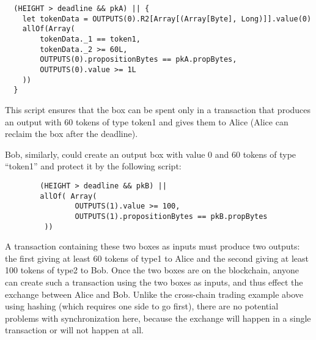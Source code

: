 \documentclass[11pt]{article}
\newcommand{\authnote}[2]{\marginpar{\parbox{\marginparwidth}{\tiny %
  \textsf{#1 {\textcolor{blue}{notes: #2}}}}}%
  \textcolor{blue}{\textbf{\dag}}}
\newcommand{\authnote}[2]{
  \textsf{#1 \textcolor{blue}{: #2}}}
\newcommand{\authnote}[2]{}
\newcommand{\lnote}[1]{{\authnote{\textcolor{orange}{Leo notes}}{#1}}}
\newcommand{\mnote}[1]{{\authnote{\textcolor{red}{Morphic}}{#1}}}
\begin{document}
\begin{verbatim}
  (HEIGHT > deadline && pkA) || {
    let tokenData = OUTPUTS(0).R2[Array[(Array[Byte], Long)]].value(0)
    allOf(Array(
        tokenData._1 == token1,
        tokenData._2 >= 60L,
        OUTPUTS(0).propositionBytes == pkA.propBytes,
        OUTPUTS(0).value >= 1L
    ))
  }
\end{verbatim}

This script ensures that the box can be spent only in a transaction that produces an output with 60 tokens of type token1 and gives them to Alice (Alice can reclaim the box after the deadline). 

\lnote{the above doesn't work for some reason --- I get a parser exception ``ParserException: Unsupported type (Array[SByte],ArrayBuffer())''. What am I doing wrong?}

\mnote{ We currently don't have string literals "token1", we don't even have
String type. Here we actually need ByteArray type to compare with the second
component of the pair. The values of such type cannot be written in the
script directly using literal syntax. They can be passed as environment
variables, which are resolved at compile time and replaced in the script by
constants of the corresponding type. Alternatively they can be passed as
context vars (getVar[T](id) syntax) or as registers. }

Bob, similarly, could create an output box with value 0
\lnote{for some reason the example in the code wants value 1 --- why? It's not explained.} and 60 tokens of type ``token1'' and protect it by the following script:
\begin{verbatim}
        (HEIGHT > deadline && pkB) || 
        allOf( Array( 
                OUTPUTS(1).value >= 100,
                OUTPUTS(1).propositionBytes == pkB.propBytes
         ))
\end{verbatim}

\lnote{The above code does not match, when compiled, the proposition in AssetsAtomicExchangeSpecification.scala. I don't understand why.}
\mnote{The order of arguments of AND matters.}
A transaction containing these two boxes as inputs must produce two outputs: the first giving at least 60 tokens of type1 to Alice and the second giving at least 100 tokens of type2 to Bob. Once the two boxes are on the blockchain, anyone can create such a transaction using the two boxes as inputs, and thus effect the exchange between Alice and Bob. Unlike the cross-chain trading example above using hashing (which requires one side to go first), there are no potential problems with synchronization here, because the exchange will happen in a single transaction or will not happen at all.
\end{document}
